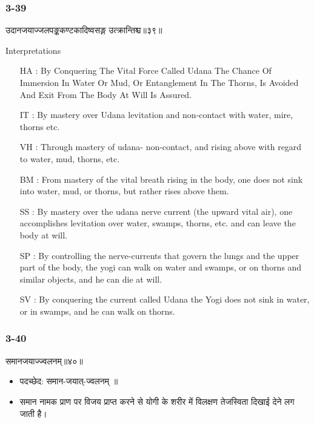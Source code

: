 \begin{frame}[fragile]\frametitle{3-39}
\begin{sanskrit}
उदानजयाज्जलपङ्ककण्टकादिष्वसङ्ग उत्क्रान्तिश्च॥३९॥
\end{sanskrit}

Interpretations
\begin{itemize}	
\item [HA]: By Conquering The Vital Force Called Udana The Chance Of Immersion In Water Or Mud, Or Entanglement In The Thorns, Is Avoided And Exit From The Body At Will Is Assured.
\item [IT]: By mastery over Udana levitation and non-contact with water, mire, thorns etc.
\item [VH]: Through mastery of udana- non-contact, and rising above with regard to water, mud, thorns, etc.
\item [BM]: From mastery of the vital breath rising in the body, one does not sink into water, mud, or thorns, but rather rises above them.
\item [SS]: By mastery over the udana nerve current (the upward vital air), one accomplishes levitation over water, swamps, thorns, etc. and can leave the body at will.
\item [SP]: By controlling the nerve-currents that govern the lungs and the upper part of the body, the yogi can walk on water and swamps, or on thorns and similar objects, and he can die at will.
\item [SV]: By conquering the current called Udana the Yogi does not sink in water, or in swamps, and he can walk on thorns. 
\end{itemize}
\end{frame}

\begin{frame}[fragile]\frametitle{3-40}
\begin{sanskrit}
समानजयाज्ज्वलनम्॥४०॥
\end{sanskrit}

\begin{itemize}
\item पदच्छेद:  समान-जयात्-ज्वलनम् ॥
\item समान नामक प्राण पर विजय प्राप्त करने से योगी के शरीर में विलक्षण तेजस्विता दिखाई देने लग जाती है।
\end{itemize}
\end{frame}

